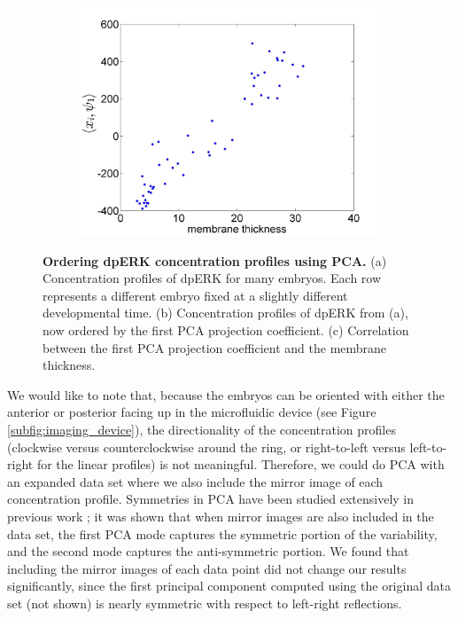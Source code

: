 \documentclass[10pt]{article}
\begin{document}
\begin{figure}[!ht]
\begin{subfigure}{0.3\textwidth}
\includegraphics[width=\textwidth]{PCA_time_corr}
\caption{}
\end{subfigure}
\caption{{\bf Ordering dpERK concentration profiles using PCA.} (a) Concentration profiles of dpERK for many embryos. Each row represents a different embryo fixed at a slightly different developmental time.
(b) Concentration profiles of dpERK from (a), now ordered by the first PCA projection coefficient.
(c) Correlation between the first PCA projection coefficient and the membrane thickness.}
\label{fig:PCA_ordering}
\end{figure}

We would like to note that, because the embryos can be oriented with either the anterior or posterior facing up in the microfluidic device (see Figure \ref{subfig:imaging_device}), the directionality of the concentration profiles (clockwise versus counterclockwise around the ring, or right-to-left versus left-to-right for the linear profiles) is not meaningful. 
%
Therefore, we could do PCA with an expanded data set where we also include the mirror image of each concentration profile.
%
Symmetries in PCA have been studied extensively in previous work \cite{holmes1998turbulence}; it was shown that when mirror images are also included in the data set, the first PCA mode captures the symmetric portion of the variability, and the second mode captures the anti-symmetric portion.
%
We found that including the mirror images of each data point did not change our results significantly, since the first principal component computed using the original data set (not shown) is nearly symmetric with respect to left-right reflections.
\end{document}
